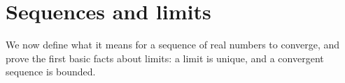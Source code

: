 \section{Sequences and limits}
We now define what it means for a sequence of real numbers to converge, and
prove the first basic facts about limits: a limit is unique, and a
convergent sequence is bounded.


